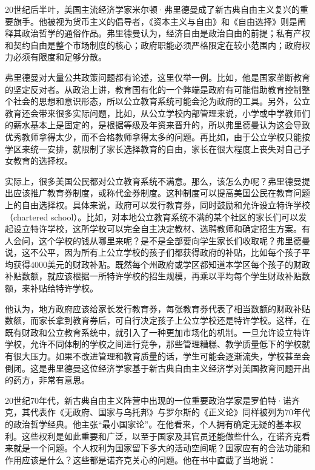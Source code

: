 20世纪后半叶，美国主流经济学家米尔顿·弗里德曼成了新古典自由主义复兴的重要旗手。他被视为货币主义的倡导者，《资本主义与自由》和《自由选择》则是阐释其政治哲学的通俗作品。弗里德曼认为，经济自由是政治自由的前提；私有产权和契约自由是整个市场制度的核心；政府职能必须严格限定在较小范围内；政府权力必须有限度和足够分散。

弗里德曼对大量公共政策问题都有论述，这里仅举一例。比如，他是国家垄断教育的坚定反对者。从政治上讲，教育国有化的一个弊端是政府有可能借助教育控制整个社会的思想和意识形态，所以公立教育系统可能会沦为政府的工具。另外，公立教育还会带来很多实际问题，比如，从公立学校内部管理来说，小学或中学教师们的薪水基本上是固定的，是根据等级及年资来晋升的，所以弗里德曼认为这会导致优秀教师拿得太少，而不合格教师拿得太多的问题。再比如，由于公立学校只能按学区来统一安排，就限制了家长选择教育的自由，家长在很大程度上丧失对自己子女教育的选择权。

实际上，很多美国公民都对公立教育系统不满意。那么，该怎么办呢？弗里德曼提出应该推广教育券制度，或称代金券制度。这种制度可以提高美国公民在教育问题上的自由选择权。具体来说，政府可以发行教育券，同时鼓励和允许设立特许学校（chartered school）。比如，对本地公立教育系统不满的某个社区的家长们可以发起设立特许学校，这所学校可以完全自主决定教材、选聘教师和确定招生方案。有人会问，这个学校的钱从哪里来呢？是不是全部要向学生家长们收取呢？弗里德曼说，这不公平，因为所有上公立学校的孩子们都获得政府的补贴，比如每个孩子平均获得4000美元的财政补贴。既然每个州政府或学区都知道本学区每个孩子的财政补贴数额，就应该根据一所特许学校的招生规模，再乘以平均每个学生财政补贴数额，来补贴给特许学校。

他认为，地方政府应该给家长发行教育券，每张教育券代表了相当数额的财政补贴数额，而家长拿到教育券后，可自行决定孩子上公立学校还是特许学校。这样，在既有财政和公立教育系统中，就引入了一种更加市场化的机制。一旦允许设立特许学校，允许不同体制的学校之间进行竞争，那些管理糟糕、教学质量低下的学校就有很大压力。如果不改进管理和教育质量的话，学生可能会逐渐流失，学校甚至会倒闭。这是弗里德曼这位经济学家基于新古典自由主义经济学对美国教育问题开出的药方，非常有意思。

20世纪70年代，新古典自由主义阵营中出现的一位重要政治学家是罗伯特·诺齐克，其代表作《无政府、国家与乌托邦》与罗尔斯的《正义论》同样被列为70年代的政治哲学经典。他主张“最小国家论”。在他看来，个人拥有确定无疑的基本权利。这些权利是如此重要和广泛，以至于国家及其官员还能做些什么，在诺齐克看来就是一个问题。个人权利为国家留下多大的活动空间呢？国家应有的合法功能和作用应该是什么？这些都是诺齐克关心的问题。他在书中直截了当地说：


